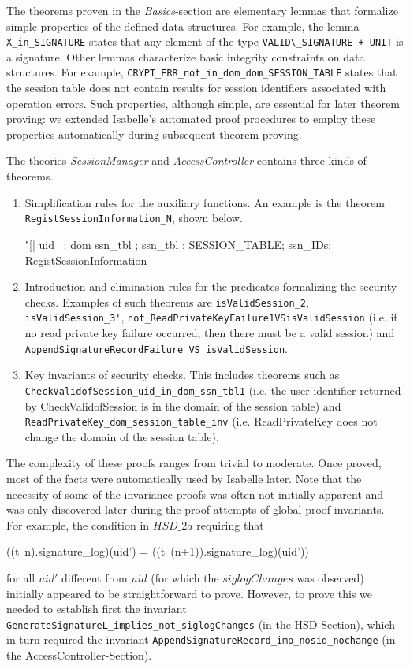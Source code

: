 \documentclass[a4paper,pdftex]{article}
\def\inlinesml{\lstinline[style=sml]}
\newcommand{\zcomment}[1]{#1}
\begin{document}
The theorems proven in the \emph{Basics}-section are elementary lemmas
that formalize simple properties of the defined data structures.  For
example, the lemma \inlinesml+X_in_SIGNATURE+ states that any element of
the type \inlinesml$VALID\_SIGNATURE + UNIT$ is a signature.  Other
lemmas characterize basic integrity constraints on data structures.
For example, 
\inlinesml+CRYPT_ERR_not_in_dom_dom_SESSION_TABLE+ states that
the session table does not contain results for session identifiers
associated with operation errors.  Such properties, although simple, are
essential for later theorem proving: we extended Isabelle's
automated proof procedures to employ these properties automatically
during subsequent theorem proving.

The theories \emph{SessionManager} and \emph{AccessController}
contains three kinds of theorems.
\begin{enumerate} \raggedright
\item Simplification rules for the auxiliary functions.  An example is
the theorem  \inlinesml+RegistSessionInformation_N+, shown below.
\begin{sml} 
"[| uid ~: dom ssn_tbl ; 
    ssn_tbl : SESSION_TABLE; ssn_IDs: %
 RegistSessionInformation %
\end{sml}


\item Introduction and elimination rules for 
      the predicates formalizing the security
      checks.  Examples of such theorems are \inlinesml+isValidSession_2+,
      \inlinesml+isValidSession_3'+, 
      \inlinesml+not_ReadPrivateKeyFailure1VSisValidSession+
      (i.e. if no read private key failure occurred, then
      there must be a valid session) and
      \inlinesml+AppendSignatureRecordFailure_VS_isValidSession+.
\item Key invariants of security checks. This includes theorems such as
      \inlinesml+CheckValidofSession_uid_in_dom_ssn_tbl1+
      (i.e. the user identifier returned by CheckValidofSession
       is in the domain of the session table)
       and \inlinesml+ReadPrivateKey_dom_session_table_inv+
       (i.e. ReadPrivateKey does not change the domain of the 
       session table).
\end{enumerate}
The complexity of these proofs ranges from trivial to moderate.  Once
proved, most of the facts were automatically used by Isabelle later.
Note that the necessity of some of the invariance proofs was often not
initially apparent and was only discovered later during the proof attempts of
global proof invariants.  For example, the condition in $HSD\_2a$
requiring that
\zcomment{
\begin{zed}
 ((t~n).signature\_log)(uid') =  ((t~(n+1)).signature\_log)(uid'))
\end{zed} \noindent
}
for all $uid'$ different from $uid$ (for which the $siglogChanges$ was
observed) initially appeared to be straightforward to prove. However, 
to prove this we needed to establish first the invariant
\inlinesml+GenerateSignatureL_implies_not_siglogChanges+ (in the
HSD-Section),
which in turn required the invariant
\inlinesml+AppendSignatureRecord_imp_nosid_nochange+ (in the
AccessController-Section).
\end{document}
